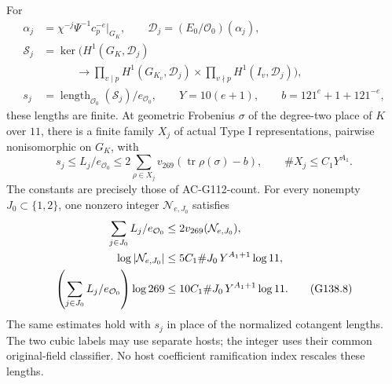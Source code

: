 \begin{theorem}
For
\[
 \begin{split}
 \alpha_j&=\chi^{-j}\Psi^{-1}c_p^{-e}|_{G_K},\qquad
 \mathcal D_j=(E_0/\mathcal O_0)(\alpha_j),\\
 \mathcal S_j&=\ker\bigl(H^1(G_K,\mathcal D_j)\\
 &\hspace{3em}\longrightarrow
 \prod_{v\mid p}H^1(G_{K_v},\mathcal D_j)
 \times\prod_{v\nmid p}H^1(I_v,\mathcal D_j)\bigr),\\
 s_j&=\operatorname{length}_{\mathcal O_0}(\mathcal S_j)/
                                  e_{\mathcal O_0},
 \qquad Y=10(e+1),\qquad b=121^e+1+121^{-e},
 \end{split}
 \tag{G138.6}
\]
these lengths are finite.  At geometric Frobenius \(\sigma\)
of the degree-two place of \(K\) over \(11\), there is a finite
family \(X_j\) of actual Type I representations, pairwise
nonisomorphic on \(G_K\), with
\[
 s_j\le L_j/e_{\mathcal O_0}
 \le2\sum_{\rho\in X_j}
            v_{269}(\operatorname{tr}\rho(\sigma)-b),
 \qquad \#X_j\le C_1Y^{A_1}.
 \tag{G138.7}
\]
The constants are precisely those of AC-G112-count.
For every nonempty \(J_0\subset\{1,2\}\), one nonzero integer
\(\mathcal N_{e,J_0}\) satisfies
\begin{align}
 \sum_{j\in J_0}L_j/e_{\mathcal O_0}
      &\le2v_{269}(\mathcal N_{e,J_0}),\notag\\
 \log|\mathcal N_{e,J_0}|
      &\le5C_1\#J_0\,Y^{A_1+1}\log11,\notag\\
 \left(\sum_{j\in J_0}L_j/e_{\mathcal O_0}\right)\log269
      &\le10C_1\#J_0\,Y^{A_1+1}\log11.
 \tag{G138.8}
\end{align}
The same estimates hold with \(s_j\) in place of the normalized
cotangent lengths.  The two cubic labels may use separate hosts;
the integer uses their common original-field classifier.
No host coefficient ramification index rescales these lengths.
\end{theorem}

